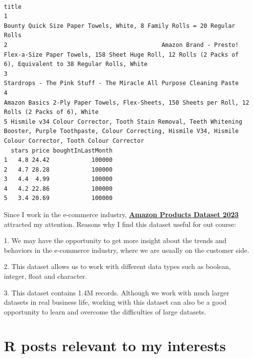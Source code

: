 \documentclass[
  letterpaper,
  DIV=11,
  numbers=noendperiod]{scrreprt}
\begin{document}
\begin{verbatim}
                                                                                                                                                                            title
1                                                                                                        Bounty Quick Size Paper Towels, White, 8 Family Rolls = 20 Regular Rolls
2                                            Amazon Brand - Presto! Flex-a-Size Paper Towels, 158 Sheet Huge Roll, 12 Rolls (2 Packs of 6), Equivalent to 38 Regular Rolls, White
3                                                                                                             Stardrops - The Pink Stuff - The Miracle All Purpose Cleaning Paste
4                                                                              Amazon Basics 2-Ply Paper Towels, Flex-Sheets, 150 Sheets per Roll, 12 Rolls (2 Packs of 6), White
5 Hismile v34 Colour Corrector, Tooth Stain Removal, Teeth Whitening Booster, Purple Toothpaste, Colour Correcting, Hismile V34, Hismile Colour Corrector, Tooth Colour Corrector
  stars price boughtInLastMonth
1   4.8 24.42            100000
2   4.7 28.28            100000
3   4.4  4.99            100000
4   4.2 22.86            100000
5   3.4 20.69            100000
\end{verbatim}

Since I work in the e-commerce industry,
\href{https://www.kaggle.com/datasets/asaniczka/amazon-products-dataset-2023-1-4m-products}{\textbf{Amazon
Products Dataset 2023}} attracted my attention. Reasons why I find this
dataset useful for out course:

1. We may have the opportunity to get more insight about the trends and
behaviors in the e-commerce industry, where we are usually on the
customer side.

2. This dataset allows us to work with different data types such as
boolean, integer, float and character.

3. This dataset contains 1.4M records. Although we work with much larger
datasets in real business life, working with this dataset can also be a
good opportunity to learn and overcome the difficulties of large
datasets.

\hypertarget{r-posts-relevant-to-my-interests}{%
\section{R posts relevant to my
interests}\label{r-posts-relevant-to-my-interests}}
\end{document}
